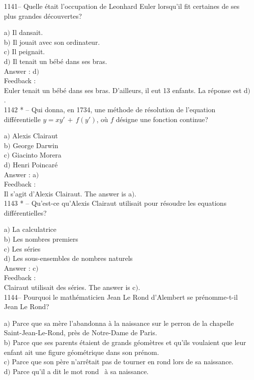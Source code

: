 \documentclass[letterpaper, 12pt]{article}
\begin{document}
1141-- Quelle \'etait l'occupation de Leonhard Euler lorsqu'il fit
certaines de ses plus grandes d\'ecouvertes?

a$)$ Il dansait. \\
b$)$ Il jouait avec son ordinateur.  \\
c$)$ Il peignait.   \\
d$)$ Il tenait un b\'eb\'e dans ses bras.  \\

Answer : d$)$\\

Feedback : \\
Euler tenait un b\'eb\'e dans ses bras. D'ailleurs, il eut 13 enfants. La
r\'eponse est d$)$. \\

1142 * -- Qui donna, en 1734, une m\'ethode de r\'esolution de
l'equation diff\'erentielle $y=xy'\,+\,f(y')$, o\`u $f$ d\'esigne
une fonction continue?

a$)$ Alexis Clairaut \\
b$)$ George Darwin   \\
c$)$ Giacinto Morera  \\
d$)$ Henri Poincar\'e \\

Answer : a$)$\\

Feedback : \\
Il s'agit d'Alexis Clairaut. The answer is a$)$. \\

1143 * -- Qu'est-ce qu'Alexis Clairaut utilisait pour r\'esoudre les
equations diff\'erentielles?

a$)$ La calculatrice \\
b$)$ Les nombres premiers \\
c$)$ Les s\'eries \\
d$)$ Les sous-ensembles de nombres naturels  \\

Answer : c$)$\\

Feedback : \\
Clairaut utilisait des s\'eries. The answer is c$)$. \\

1144-- Pourquoi le math\'ematicien Jean Le Rond d'Alembert se
pr\'enomme-t-il Jean Le Rond?

a$)$ Parce que sa m\`ere l'abandonna \`a la naissance sur le perron de la
chapelle Saint-Jean-Le-Rond, pr\`es de
Notre-Dame de Paris. \\
b$)$ Parce que ses parents \'etaient de grands g\'eom\`etres et qu'ils
voulaient que leur enfant ait une figure
g\'eom\'etrique dans son pr\'enom. \\
c$)$ Parce que son p\`ere n'arr\^etait pas de tourner en rond lors de sa
naissance.  \\
d$)$ Parce qu'il a dit le mot \og rond \fg\ \`a sa naissance.  \\
\end{document}
